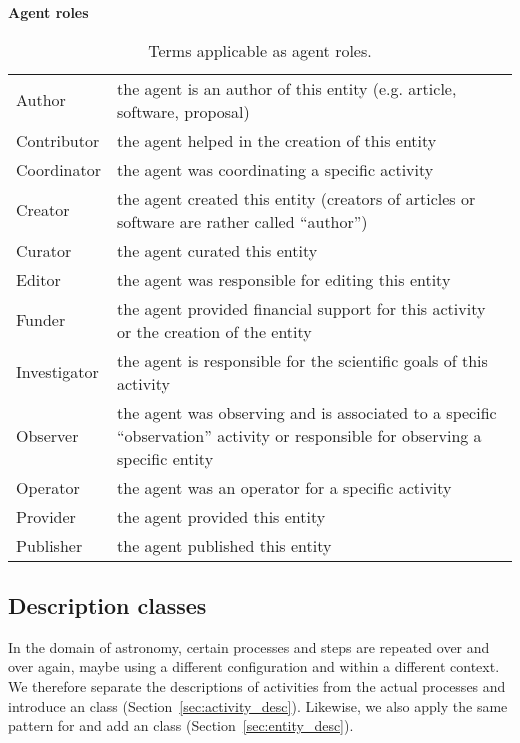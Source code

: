 \begin{table}[ht]
\small
{}\textwidth
\textbf{\normalsize Agent roles}\vspace{0.25em}\\
\begin{tabulary}{1.0\textwidth}{lL}
\toprule
{} &  \\
\midrule
Author      & the agent is an author of this entity (e.g. article, software, proposal)\\
Contributor & the agent helped in the creation of this entity \\
Coordinator & the agent was coordinating a specific activity \\ %
Creator     & the agent created this entity (creators of articles or software are rather called ``author'') \\
Curator     & the agent curated this entity \\
Editor      & the agent was responsible for editing this entity \\
Funder      & the agent provided financial support for this activity or the creation of the entity \\
Investigator & the agent is responsible for the scientific goals of this activity \\
Observer    & the agent was observing and is associated to a specific “observation” activity or responsible for observing a specific entity \\
Operator    & the agent was an operator for a specific activity \\ %
Provider    & the agent provided this entity \\
Publisher   & the agent published this entity \\
\bottomrule
\end{tabulary}
\caption[Terms applicable as agent roles.]{Terms applicable as agent roles.}
\label{tab:agent-roles}
\end{table}




\subsection{Description classes}
\label{sec:descriptions}

In the domain of astronomy, certain processes and steps are repeated over and over again, maybe using a different configuration and within a different context. 
We therefore separate the descriptions of activities from the actual processes and introduce an  class (Section~\ref{sec:activity_desc}). 
Likewise, we also apply the same pattern for  and add an  class (Section~\ref{sec:entity_desc}). 

